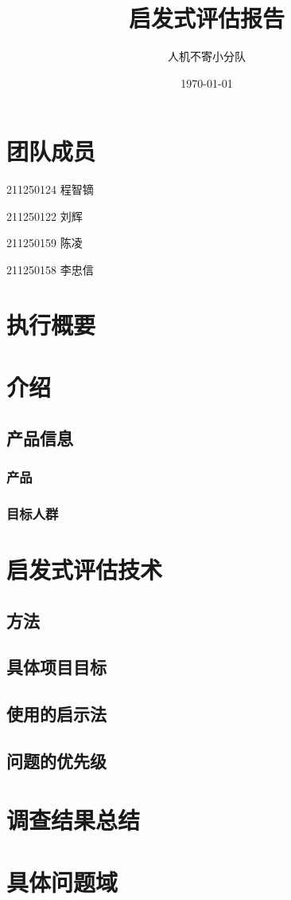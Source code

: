 \documentclass[a4paper,12pt]{article}
\title{启发式评估报告}
\author{人机不寄小分队}
\date{\today}
\begin{document}
    \maketitle

    \tableofcontents

    \section{团队成员}
    211250124 程智镝

    211250122 刘辉

    211250159 陈凌

    211250158 李忠信
    \section{执行概要}

    \section{介绍}
    \subsection{产品信息}
    \subsubsection{产品}
    \subsubsection{目标人群}

    \section{启发式评估技术}
    \subsection{方法}
    \subsection{具体项目目标}
    \subsection{使用的启示法}
    \subsection{问题的优先级}
    
    \section{调查结果总结}

    \section{具体问题域}
\end{document}
